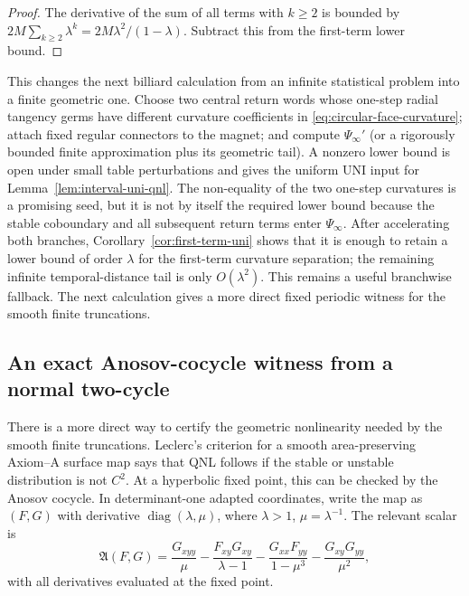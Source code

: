 \documentclass[11pt]{article}
\begin{document}
\begin{proof}
The derivative of the sum of all terms with $k\ge2$ is bounded by
$2M\sum_{k\ge2}\lambda^k=2M\lambda^2/(1-\lambda)$.  Subtract this from the
first-term lower bound.
\end{proof}

This changes the next billiard calculation from an infinite statistical
problem into a finite geometric one.  Choose two central return words whose
one-step radial tangency germs have different curvature coefficients in
\eqref{eq:circular-face-curvature}; attach fixed regular connectors to the
magnet; and compute $\Psi_\infty'$ (or a rigorously bounded finite
approximation plus its geometric tail).  A nonzero lower bound is open under
small table perturbations and gives the uniform UNI input for
Lemma~\ref{lem:interval-uni-qnl}.  The non-equality of the two one-step
curvatures is a promising seed, but it is not by itself the required lower
bound because the stable coboundary and all subsequent return terms enter
$\Psi_\infty$.
After accelerating both branches, Corollary~\ref{cor:first-term-uni} shows
that it is enough to retain a lower bound of order $\lambda$ for the
first-term curvature separation; the remaining infinite temporal-distance
tail is only $O(\lambda^2)$.  This remains a useful branchwise fallback.  The
next calculation gives a more direct fixed periodic witness for the smooth
finite truncations.

\subsection{An exact Anosov-cocycle witness from a normal two-cycle}

There is a more direct way to certify the geometric nonlinearity needed by
the smooth finite truncations.  Leclerc's criterion for a smooth
area-preserving Axiom--A surface map says that QNL follows if the stable or
unstable distribution is not $C^2$.  At a hyperbolic fixed point, this can be
checked by the Anosov cocycle.  In determinant-one adapted coordinates, write
the map as $(F,G)$ with derivative
$\operatorname{diag}(\lambda,\mu)$, where $\lambda>1$, $\mu=\lambda^{-1}$.
The relevant scalar is
\begin{equation}
\label{eq:anosov-cocycle}
 \mathfrak A(F,G)
 =\frac{G_{xyy}}{\mu}
 -\frac{F_{xy}G_{xy}}{\lambda-1}
 -\frac{G_{xx}F_{yy}}{1-\mu^3}
 -\frac{G_{xy}G_{yy}}{\mu^2},
\end{equation}
with all derivatives evaluated at the fixed point.
\end{document}

